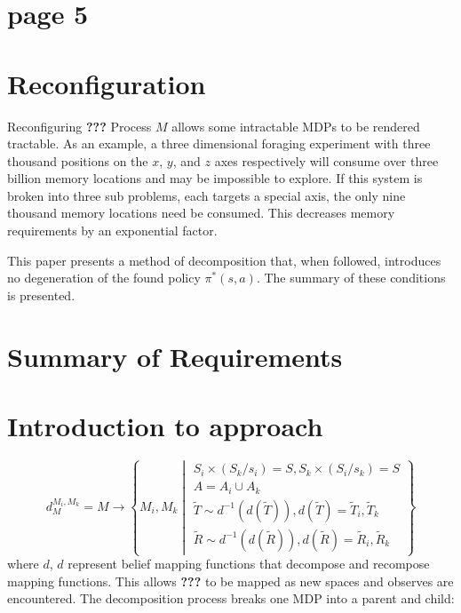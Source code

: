 \section*{page 5}

\section{Reconfiguration}

Reconfiguring \textbf{???} Process $M$ allows some intractable MDPs to be rendered tractable. 
As an example, a three dimensional foraging experiment with three thousand positions on the $x$, $y$, and $z$
axes respectively will consume over three billion memory locations and may be impossible to explore. If this system is
broken into three sub problems, each targets a special axis, the only nine thousand memory locations need be consumed. This decreases memory requirements by an exponential factor.

This paper presents a method of decomposition that, when followed, introduces no degeneration of the found policy $\pi^{*}(s,a)$.
The summary of these conditions is presented.

\section*{Summary of Requirements}

\section*{Introduction to approach}

\begin{equation*}
d^{M_i,M_k}_{M} = M \longrightarrow \left\{    M_i, M_k \middle|
\begin{array}{l}
S_i\times(S_k/s_i)=S, S_k\times(S_i/s_k)=S\\
A=A_i \cup A_k\\
\tilde{T}\sim d^{-1}(d(\tilde{T})),d(\tilde{T})=\tilde{T}_i, \tilde{T}_k\\
\tilde{R}\sim d^{-1}(d(\tilde{R})), d(\tilde{R})=\tilde{R}_i,\tilde{R}_k
\end{array}
 \right\}
\end{equation*}
where $d$, $d$ represent belief mapping functions that decompose and recompose mapping functions. This allows   \textbf{???} to be mapped as new spaces and observes are encountered. The decomposition process breaks one MDP into a parent and child:
